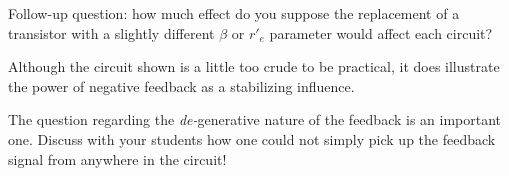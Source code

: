 \vskip 10pt

Follow-up question: how much effect do you suppose the replacement of a transistor with a slightly different $\beta$ or $r'_e$ parameter would affect each circuit?







Although the circuit shown is a little too crude to be practical, it does illustrate the power of negative feedback as a stabilizing influence.

The question regarding the {\it de-}generative nature of the feedback is an important one.  Discuss with your students how one could not simply pick up the feedback signal from anywhere in the circuit!




